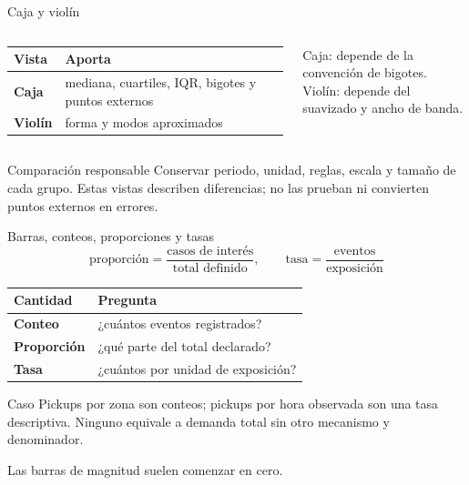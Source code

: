 \documentclass[aspectratio=169,11pt]{beamer}
\newcommand{\br}{\\}
\begin{document}
\begin{frame}{Caja y violín}
  \small
  \begin{columns}[T]
      \begin{tabularx}{\textwidth}{>{\bfseries}p{} X}
        \toprule
        Vista & Aporta \\
        \midrule
        Caja & mediana, cuartiles, IQR, bigotes y puntos externos \\
        Violín & forma y modos aproximados \\
        \bottomrule
      \end{tabularx}
      \vspace{.6em}
      Caja: depende de la convención de bigotes.\br
      Violín: depende del suavizado y ancho de banda.
      \centering
  \end{columns}
  \begin{block}{Comparación responsable}
    Conservar periodo, unidad, reglas, escala y tamaño de cada grupo. Estas vistas describen diferencias; no las prueban ni convierten puntos externos en errores.
  \end{block}
\end{frame}

\begin{frame}{Barras, conteos, proporciones y tasas}
  \small
  \[
    \text{proporción}=\frac{\text{casos de interés}}{\text{total definido}},\qquad
    \text{tasa}=\frac{\text{eventos}}{\text{exposición}}
  \]
  \begin{tabularx}{\textwidth}{>{\bfseries}p{} X}
    \toprule
    Cantidad & Pregunta \\
    \midrule
    Conteo & ¿cuántos eventos registrados? \\
    Proporción & ¿qué parte del total declarado? \\
    Tasa & ¿cuántos por unidad de exposición? \\
    \bottomrule
  \end{tabularx}
  \vfill
  \begin{block}{Caso}
    Pickups por zona son conteos; pickups por hora observada son una tasa descriptiva. Ninguno equivale a demanda total sin otro mecanismo y denominador.
  \end{block}
  \centering Las barras de magnitud suelen comenzar en cero.
\end{frame}
\end{document}
